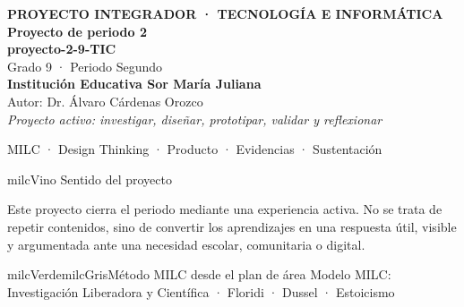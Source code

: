 \documentclass[11pt,letterpaper]{article}
\begin{document}
\thispagestyle{empty}

\vspace*{.85cm}
\begin{tcolorbox}[
  enhanced,colback=milcVino,colframe=milcVino,arc=12mm,width=.86\textwidth,
  boxrule=0pt,left=12mm,right=12mm,top=11mm,bottom=11mm,center,
  overlay={\draw[milcMagenta,line width=2pt,dash pattern=on 9pt off 8pt,rounded corners=10mm]
  ([xshift=7mm,yshift=-7mm]frame.north west) rectangle ([xshift=-7mm,yshift=7mm]frame.south east);}]
  \centering
  {\sffamily\bfseries\color{white}\fontsize{15}{17}\selectfont PROYECTO INTEGRADOR · TECNOLOGÍA E INFORMÁTICA}\\[1.0cm]
  {\sffamily\bfseries\color{white}\fontsize{30}{33}\selectfont Proyecto de periodo 2}\\[3mm]
  {\sffamily\bfseries\color{milcMostaza}\fontsize{25}{28}\selectfont proyecto-2-9-TIC}\\[8mm]
  {\sffamily\color{white}\Large Grado 9 · Periodo Segundo}\\[1.0cm]
  {\sffamily\bfseries\color{white}\large Institución Educativa Sor María Juliana}\\[2mm]
  {\sffamily\color{white}Autor: Dr. Álvaro Cárdenas Orozco}\\[4mm]
  {\sffamily\itshape\color{white}Proyecto activo: investigar, diseñar, prototipar, validar y reflexionar}
\end{tcolorbox}
\vfill
\begin{tcolorbox}[enhanced,colback=milcVino!72!black,colframe=milcVino!72!black,arc=5mm,boxrule=0pt,width=.86\textwidth,left=6mm,right=6mm,top=4mm,bottom=4mm,center]
{\color{white}\sffamily\small MILC · Design Thinking · Producto · Evidencias · Sustentación}
\end{tcolorbox}

\newpage
\begin{titlebox}{milcVino}
Sentido del proyecto
\end{titlebox}
\begin{multicols}{2}
Este proyecto cierra el periodo mediante una experiencia activa. No se trata de repetir contenidos, sino de convertir los aprendizajes en una respuesta útil, visible y argumentada ante una necesidad escolar, comunitaria o digital.

\columnbreak
\begin{softbox}{milcVerde}{milcGris}{Método MILC desde el plan de área}
Modelo MILC: Investigación Liberadora y Científica · Floridi · Dussel · Estoicismo
\end{softbox}
\end{multicols}
\end{document}
